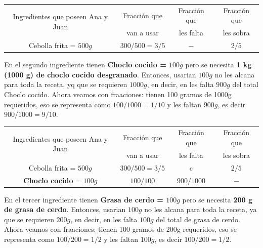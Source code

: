 \documentclass[11pt]{examdesign}
\theoremstyle{plain}
\theoremstyle{definition}
\theoremstyle{remark}
\begin{document}
\begin{shortanswer}[title={\textit{Receta que le dijo la Abuela Pocha a Ana y
    			Juan.}},
    	rearrange=no,resetcounter=no]
\begin{question}
\begin{answer}
    			\begin{center}
    				\begin{tabular}{|c|c|c|c|}
    					\hline 
    					\multirow{2}{*}{Ingredientes que poseen Ana y Juan} &Fracción que&
    					Fracción que&Fracción que
    					\\
    					&  van a usar   &les falta   & les sobra
    					\\\hline  
    					Cebolla frita = $500g$    & $300/500=3/5$ & $-$        & $2/5$   
    					\\\hline
    				\end{tabular}
    			\end{center}
    			
    			En el segundo ingrediente tienen \textbf{Choclo cocido = $100g$} pero se necesita \textbf{1 kg (1000 g) de choclo cocido desgranado}. Entonces, usarian $100g$ no les alcana para toda la receta, yq que se requieren $1000g$, en decir, en les falta $900g$ del total Choclo cocido. Ahora veamos con fraaciones: tienen 100 gramos de 1000g requeridos, eso se representa como $100/1000=1/10$ y les faltan $900g$, es decir $900/1000=9/10$.
    			
    			\begin{center}
    				\begin{tabular}{|c|c|c|c|}
    					\hline 
    					\multirow{2}{*}{Ingredientes que poseen Ana y Juan} &Fracción que&
    					Fracción que&Fracción que
    					\\
    					&  van a usar   &les falta   & les sobra
    					\\\hline  
    					Cebolla frita = $500g$    & $300/500=3/5$ & c        & $2/5$   
    					\\\hline
    					\textbf{Choclo cocido} = $100g$    & $100/100$     & $900/1000$ & $-$    
    					\\\hline
    				\end{tabular}
    			\end{center}
    		
    		   En el tercer ingrediente tienen \textbf{Grasa de cerdo = $100g$} pero se necesita \textbf{200 g de grasa de cerdo}. Entonces, usarian $100g$ no les alcana para toda la receta, ya que se requieren $200g$, en decir, en les falta $100g$ del total de grasa de cerdo. Ahora veamos con fraaciones: tienen 100 gramos de 200g requeridos, eso se representa como $100/200=1/2$ y les faltan $100g$, es decir $100/200=1/2$.
    		   

\end{answer}
\end{question}
\end{shortanswer}
\end{document}

